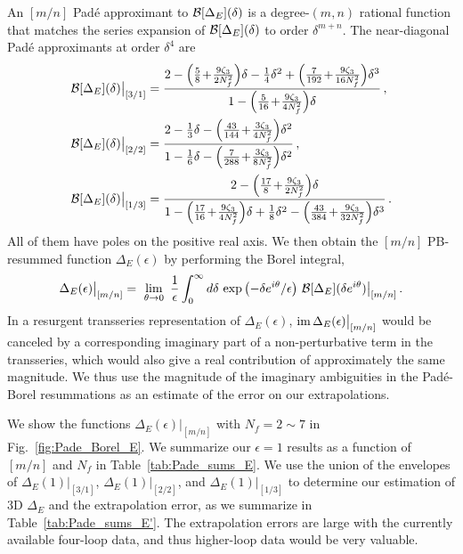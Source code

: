 \documentclass[
 reprint,







nofootinbib,


 amsmath,amssymb,
 aps,
 prd






tightenlines
]{revtex4-2}
\begin{document}
An $[m/n]$ Pad\'e approximant to $\mathcal{B}[\Delta_E](\delta)$ is a degree-$(m,n)$ rational function that matches the series expansion of $\mathcal{B}[\Delta_E](\delta)$ to order $\delta^{m+n}$.
The near-diagonal Pad\'e approximants at order $\delta^4$ are
\begin{subequations}
\begin{align}
    \calB[\Delta_E](\delta)\big|_{[3/1]} &=
    \frac{2 - \Bigl(\frac{5}{8}\!+\!\frac{9\zeta_3}{2N_f^2}\Bigr)\delta - \frac{1}{4}\delta^2 + \Bigl(\frac{7}{192}\!+\!\frac{9\zeta_3}{16N_f^2}\Bigr)\delta^3 }
    {1 - \Bigl(\frac{5}{16}\!+\!\frac{9\zeta_3}{4N_f^2}\Bigr)\delta}\,,\\
    \calB[\Delta_E](\delta)\big|_{[2/2]} &=
    \frac{2 - \frac{1}{3}\delta - \Bigl(\frac{43}{144}\!+\!\frac{3\zeta_3}{4N_f^2}\Bigr)\delta^2}
    {1 - \frac{1}{6}\delta - \Bigl(\frac{7}{288}\!+\!\frac{3\zeta_3}{8N_f^2}\Bigr)\delta^2}\,,\\
    \calB[\Delta_E](\delta)\big|_{[1/3]} &=
    \frac{2 - \Bigl(\frac{17}{8}\!+\!\frac{9\zeta_3}{2N_f^2}\Bigr)\delta }
    {1 - \Bigl(\frac{17}{16}\!+\!\frac{9\zeta_3}{4N_f^2}\Bigr)\delta + \frac{1}{8}\delta^2 - \Bigl(\frac{43}{384}\!+\!\frac{9\zeta_3}{32N_f^2}\Bigr)\delta^3}\,.
\end{align}
\end{subequations}
All of them have poles on the positive real axis.
We then obtain the $[m/n]$ PB-resummed function $\Delta_E(\epsilon)$ by performing the Borel integral,
\begin{align}
    \Delta_E(\epsilon)\big|_{[m/n]} =\  \lim_{\theta\to0}\  \frac{1}{\epsilon}\int_0^{\infty} d \delta\, \exp\left(-\delta e^{i \theta}/\epsilon \right)\, \mathcal{B}[\Delta_E]( \delta e^{i \theta} )\big|_{[m/n]}\,.
\end{align}
In a resurgent transseries representation of $\Delta_E(\epsilon)$, $\mathop{\mathrm{im}} \Delta_E(\epsilon)\big|_{[m/n]}$ would be canceled by a corresponding imaginary part of a non-perturbative term in the transseries, which would also give a real contribution of approximately the same magnitude.  We thus use the magnitude of the imaginary ambiguities in the Pad\'e-Borel resummations as an estimate of the error on our extrapolations.


We show the functions $\Delta_E(\epsilon)|_{[m/n]}$ with $N_f=2\sim7$ in Fig.~\ref{fig:Pade_Borel_E}.
We summarize our $\epsilon=1$ results as a function of $[m/n]$ and $N_f$ in Table~\ref{tab:Pade_sums_E}.
We use the union of the envelopes of $\Delta_E(1)|_{[3/1]}$, $\Delta_E(1)|_{[2/2]}$, and $\Delta_E(1)|_{[1/3]}$ to determine our estimation of 3D $\Delta_E$ and the extrapolation error, as we summarize in Table~\ref{tab:Pade_sums_E'}.
The extrapolation errors are large with the currently available four-loop data, and thus higher-loop data would be very valuable.
\end{document}
